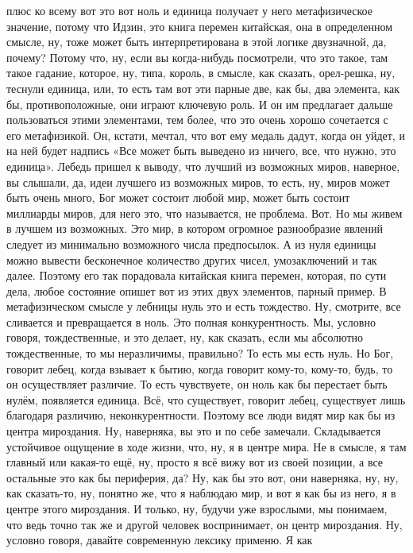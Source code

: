 плюс ко всему вот это вот ноль и единица получает у него метафизическое
значение, потому что Идзин, это книга перемен китайская, она в определенном
смысле, ну, тоже может быть интерпретирована в этой логике двузначной, да,
почему? Потому что, ну, если вы когда-нибудь посмотрели, что это такое, там
такое гадание, которое, ну, типа, король, в смысле, как сказать, орел-решка, ну,
теснули единица, или, то есть там вот эти парные две, как бы, два элемента, как
бы, противоположные, они играют ключевую роль. И он им предлагает дальше
пользоваться этими элементами, тем более, что это очень хорошо сочетается с его
метафизикой. Он, кстати, мечтал, что вот ему медаль дадут, когда он уйдет, и на
ней будет надпись «Все может быть выведено из ничего, все, что нужно, это
единица». Лебедь пришел к выводу, что лучший из возможных миров, наверное, вы
слышали, да, идеи лучшего из возможных миров, то есть, ну, миров может быть
очень много, Бог может состоит любой мир, может быть состоит миллиарды миров,
для него это, что называется, не проблема. Вот. Но мы живем в лучшем из
возможных. Это мир, в котором огромное разнообразие явлений следует из
минимально возможного числа предпосылок. А из нуля единицы можно вывести
бесконечное количество других чисел, умозаключений и так далее. Поэтому его так
порадовала китайская книга перемен, которая, по сути дела, любое состояние
опишет вот из этих двух элементов, парный пример. В метафизическом смысле у
лебницы нуль это и есть тождество. Ну, смотрите, все сливается и превращается в
ноль. Это полная конкурентность. Мы, условно говоря, тождественные, и это
делает, ну, как сказать, если мы абсолютно тождественные, то мы неразличимы,
правильно? То есть мы есть нуль. Но Бог, говорит лебец, когда взывает к бытию,
когда говорит кому-то, кому-то, будь, то он осуществляет различие. То есть
чувствуете, он ноль как бы перестает быть нулём, появляется единица. Всё, что
существует, говорит лебец, существует лишь благодаря различию, неконкурентности.
Поэтому все люди видят мир как бы из центра мироздания. Ну, наверняка, вы это и
по себе замечали. Складывается устойчивое ощущение в ходе жизни, что, ну, я в
центре мира. Не в смысле, я там главный или какая-то ещё, ну, просто я всё вижу
вот из своей позиции, а все остальные это как бы периферия, да? Ну, как бы это
вот, они наверняка, ну, ну, как сказать-то, ну, понятно же, что я наблюдаю мир,
и вот я как бы из него, я в центре этого мироздания. И только, ну, будучи уже
взрослыми, мы понимаем, что ведь точно так же и другой человек воспринимает, он
центр мироздания. Ну, условно говоря, давайте современную лексику применю. Я как
